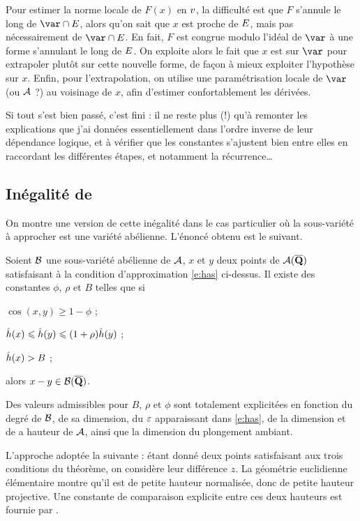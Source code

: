 Pour estimer la norme locale de $F(x)$ en $v$, la difficulté est que $F$
s'annule le long de $\var \cap \divi$, alors qu'on sait que $x$ est proche de $E$,
mais pas nécessairement de $\var \cap \divi$. En fait, $F$ est congrue modulo l'idéal
de $\var$ à une forme s'annulant le long de $E$. On exploite alors le fait que
$x$ est sur $\var$ pour extrapoler plutôt sur cette nouvelle forme, de façon à
mieux exploiter l'hypothèse sur $x$. Enfin, pour l'extrapolation, on utilise
une paramétrisation locale de $\var$ (ou $\mathcal A$ ?) au voisinage de $x$, afin
d'estimer confortablement les dérivées.

\medskip

Si tout s'est bien passé, c'est fini : il ne reste plus (!) qu'à remonter les
explications que j'ai données essentiellement dans l'ordre inverse de leur
dépendance logique, et à vérifier que les constantes s'ajustent bien entre
elles en raccordant les différentes étapes, et notamment la récurrence\dots


\subsection{Inégalité de }

On montre une version de cette inégalité dans le cas particulier où la
sous-variété à approcher est une variété abélienne.  L'énoncé obtenu est le
suivant.

\begin{thm} \label{t:mumford}
  Soient $\mathcal B$ une sous-variété abélienne de $\mathcal A$, $x$ et $y$
  deux points de $\mathcal A(\overline{{\mathbf{Q}}})$ satisfaisant à la condition d'approximation
  \eqref{e:has} ci-dessus. Il existe des constantes $\phi$, $\rho$ et $B$
  telles que si
  \begin{enumthm}
    \item $\cos(x, y) \ge 1 - \phi$ ;
    \item $\hat h (x) \leqslant \hat h (y) \leqslant (1+\rho) \hat h (y)$ ;
    \item $\hat h (x) > B$ ;
  \end{enumthm}
  alors $x - y \in \mathcal B(\overline{{\mathbf{Q}}})$.
\end{thm}

Des valeurs admissibles pour $B$, $\rho$ et $\phi$ sont totalement explicitées
en fonction du degré de $\mathcal B$, de sa dimension, du $\varepsilon$ apparaissant dans
\eqref{e:has}, de la dimension et de a hauteur de $\mathcal A$, ainsi que la dimension
du plongement ambiant.

L'approche adoptée la suivante : étant donné deux points satisfaisant aux
trois conditions du théorème, on considère leur différence $z$. La
géométrie euclidienne élémentaire montre qu'il est de petite hauteur
normalisée, donc de petite hauteur projective. Une constante de comparaison
explicite entre ces deux hauteurs est fournie par \cite{daphimhva2}.

